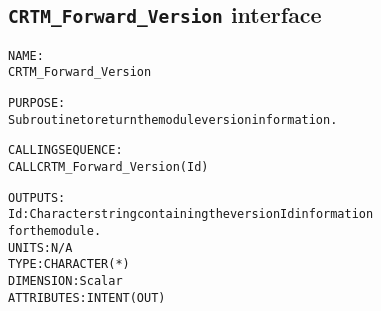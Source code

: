 \subsection{\texttt{CRTM\_Forward\_Version} interface}
  \label{sec:CRTM_Forward_Version_interface}
  \begin{alltt}
 
  NAME:
        CRTM_Forward_Version
 
  PURPOSE:
        Subroutine to return the module version information.
 
  CALLING SEQUENCE:
        CALL CRTM_Forward_Version( Id )
 
  OUTPUTS:
        Id:            Character string containing the version Id information
                       for the module.
                       UNITS:      N/A
                       TYPE:       CHARACTER(*)
                       DIMENSION:  Scalar
                       ATTRIBUTES: INTENT(OUT)
 
  \end{alltt}
